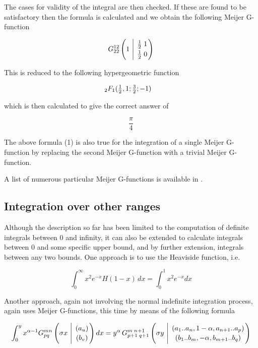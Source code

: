 The cases for validity of the integral are then checked. If these 
are found to be satisfactory then the formula is calculated and we 
obtain the following Meijer G-function 

\begin{displaymath}  
G^{1 2}_{2 2} \left(1 \ \Bigg\vert \ {\frac{1}{2} \; 1 \atop 
\frac{1}{2} \; 0} \right)
\end{displaymath} 

This is reduced to the following hypergeometric function

\begin{math}
\hspace{50mm} _2F_1 (\frac{1}{2},1;\frac{3}{2};-1 )
\end{math}

which is then calculated to give the correct answer of 

\begin{displaymath}
\frac{\pi}{4}
\end{displaymath}

The above formula (1) is also true for the integration of a single
Meijer G-function by replacing the second Meijer G-function 
with a trivial Meijer G-function.

A list of numerous particular Meijer G-functions is available in 
\cite {Prudnikov}.

\subsection{Integration over other ranges}

Although the description so far has been limited to the computation of
definite integrals between 0 and infinity, it can also be extended to
calculate integrals between 0 and some specific upper bound, and
by further extension, integrals between any two bounds.  One approach is
to use the Heaviside function, i.e.

\begin{displaymath}
\int_{0}^{\infty} x^{2} e^{-x} H(1-x)\,dx = \int_{0}^{1} x^{2} e^{-x}dx
\end{displaymath} 

Another approach, again not involving the normal indefinite integration
process, again uses Meijer G-functions, this time by means of the
following formula

\begin{equation}
\int_{0}^{y} x^{\alpha-1} G^{m n}_{p q} 
\left( \sigma x \  \Bigg\vert \  {( a_u) \atop (b_v)} \right) dx=%
y^{\alpha}\,G^{m \; n+1}_{p+1 \; q+1} \left( \sigma y \  \Bigg\vert \
{( a_1..a_n,1-\alpha,a_{n+1}..a_p) 
\atop (b_1..b_m,-\alpha,b_{m+1}..b_q)} \right) \label{defint:eq2}
\end{equation}

